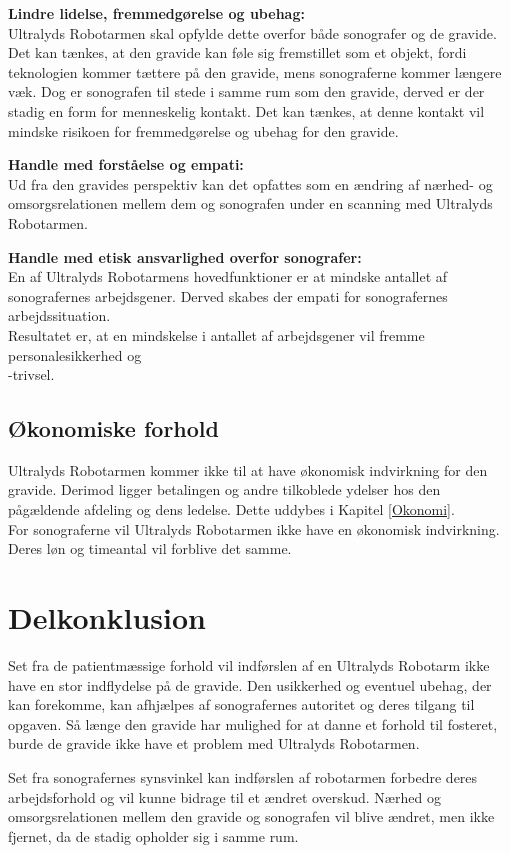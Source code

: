 \textbf{Lindre lidelse, fremmedgørelse og ubehag:}\\
Ultralyds Robotarmen skal opfylde dette overfor både sonografer og de gravide. Det kan tænkes, at den gravide kan føle sig fremstillet som et objekt, fordi teknologien kommer tættere på den gravide, mens sonograferne kommer længere væk. Dog er sonografen til stede i samme rum som den gravide, derved er der stadig en form for menneskelig kontakt. Det kan tænkes, at denne kontakt vil mindske risikoen for fremmedgørelse og ubehag for den gravide.   

\textbf{Handle med forståelse og empati:}\\
Ud fra den gravides perspektiv kan det opfattes som en ændring af nærhed- og omsorgsrelationen mellem dem og sonografen under en scanning med Ultralyds Robotarmen. 

\textbf{Handle med etisk ansvarlighed overfor sonografer:}\\
En af Ultralyds Robotarmens hovedfunktioner er at mindske antallet af sonografernes arbejdsgener. Derved skabes der empati for sonografernes arbejdssituation.\\
Resultatet er, at en mindskelse i antallet af arbejdsgener vil fremme personalesikkerhed og \\-trivsel.   		

\subsection{Økonomiske forhold}
Ultralyds Robotarmen kommer ikke til at have økonomisk indvirkning for den gravide. Derimod ligger betalingen og andre tilkoblede ydelser hos den pågældende afdeling og dens ledelse. Dette uddybes i Kapitel \ref{Okonomi}. \\
For sonograferne vil Ultralyds Robotarmen ikke have en økonomisk indvirkning. Deres løn og timeantal vil forblive det samme. 

\section{Delkonklusion}
Set fra de patientmæssige forhold vil indførslen af en Ultralyds Robotarm ikke have en stor indflydelse på de gravide. Den usikkerhed og eventuel ubehag, der kan forekomme, kan afhjælpes af sonografernes autoritet og deres tilgang til opgaven. Så længe den gravide har mulighed for at danne et forhold til fosteret, burde de gravide ikke have et problem med Ultralyds Robotarmen. 

Set fra sonografernes synsvinkel kan indførslen af robotarmen forbedre deres arbejdsforhold og vil kunne bidrage til et ændret overskud. Nærhed og omsorgsrelationen mellem den gravide og sonografen vil blive ændret, men ikke fjernet, da de stadig opholder sig i samme rum. 